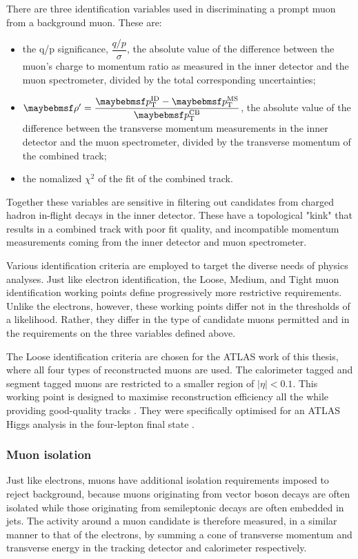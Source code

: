 There are three identification variables used in discriminating a prompt muon from a background muon. These are:
\begin{itemize}
    \item the q/p significance, $\dfrac{q/p}{\sigma}$, the absolute value of the difference between the muon's charge to momentum ratio as measured in the inner detector and the muon spectrometer, divided by the total corresponding uncertainties;
    \item $\rho'=\dfrac{\p_{\text{T}}^{\text{ID}}-\p_{\text{T}}^{\text{MS}}}{\p_{\text{T}}^{\text{CB}}}$, the absolute value of the difference between the transverse momentum measurements in the inner detector and the muon spectrometer, divided by the transverse momentum of the combined track;
    \item the nomalized $\chi^2$ of the fit of the combined track.
\end{itemize}
Together these variables are sensitive in filtering out candidates from charged hadron in-flight decays in the inner detector. These have a topological "kink" that results in a combined track with poor fit quality, and incompatible momentum measurements coming from the inner detector and muon spectrometer. 

Various identification criteria are employed to target the diverse needs of physics analyses. Just like electron identification, the Loose, Medium, and Tight muon identification working points define progressively more restrictive requirements. Unlike the electrons, however, these working points differ not in the thresholds of a likelihood. Rather, they differ in the type of candidate muons permitted and in the requirements on the three variables defined above. 

The Loose identification criteria are chosen for the ATLAS work of this thesis, where all four types of reconstructed muons are used. The calorimeter tagged and segment tagged muons are restricted to a smaller region of $|\eta|<0.1$. This working point is designed to maximise reconstruction efficiency all the while providing good-quality tracks \cite{ATLAS_muon_reco_2016}. They were specifically optimised for an ATLAS Higgs analysis in the four-lepton final state \cite{ATLAS_H4l_2015}.  

\subsubsection{Muon isolation}

Just like electrons, muons have additional isolation requirements imposed to reject background, because muons originating from vector boson decays are often isolated while those originating from semileptonic decays are often embedded in jets. The activity around a muon candidate is therefore measured, in a similar manner  to that of the electrons, by summing a cone of transverse momentum and transverse energy in the tracking detector and calorimeter respectively. 

